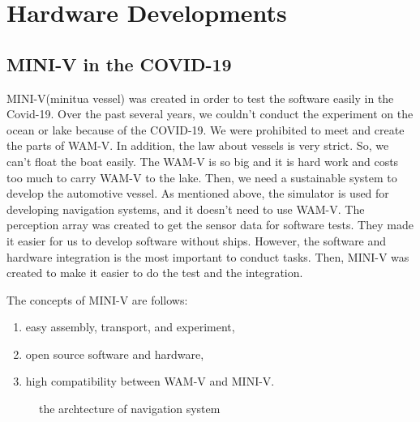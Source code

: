 \documentclass[lettersize,journal]{IEEEtran}
\begin{document}
\section{Hardware Developments}

\subsection{MINI-V in the COVID-19}
MINI-V(minitua vessel) was created in order to test the software easily in the Covid-19. Over the past several years, 
we couldn't conduct the experiment on the ocean or lake because of the COVID-19.
We were prohibited to meet and create the parts of WAM-V.
In addition, the law about vessels is very strict.
So, we can't float the boat easily. The WAM-V is so big and it is hard work and costs too much to carry WAM-V to the lake. 
Then, we need a sustainable system to develop the automotive vessel.
As mentioned above, the simulator is used for developing navigation systems, and it doesn't need to use WAM-V.
The perception array was created to get the sensor data for software tests. They made it easier for us to develop software without ships.
However, the software and hardware integration is the most important to conduct tasks. Then, MINI-V was created 
to make it easier to do the test and the integration.

The concepts of MINI-V are follows:
\begin{enumerate}
  \item easy assembly, transport, and experiment,
  \item open source software and hardware,
  \item high compatibility between WAM-V and MINI-V.
\end{enumerate}

\begin{figure}[h]
  \begin{center}
  \end{center}
  \caption{the archtecture of navigation system}
  \label{fig:arch_nav}
\end{figure}
\end{document}
